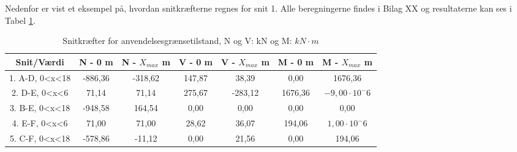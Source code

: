 Nedenfor er vist et eksempel på, hvordan snitkræfterne regnes for snit 1. Alle beregningerne findes i Bilag XX og resultaterne kan ses i Tabel \ref{tab:anden2}.
\begin{table}
	\begin{center}
		\begin{tabular}{|c|c|c|c|c|c|c|}
			\hline
			Snit/Værdi    & N - 0 m & N - $X_{max}$ m & V - 0 m & V - $X_{max}$ m & M - 0 m & M - $X_{max}$ m 	\\ \hline
			1. A-D, 0<x<18 	& -886,36 	& -318,62 	&  147,87 	&  38,39 	&  0,00     &  1676,36        		\\ \hline
			2. D-E, 0<x<6  	&  71,14    &  71,14    &  275,67   & -283,12   &  1676,36  &  $-9,00\cdot10^-6$    \\ \hline
			3. B-E, 0<x<18  & -948,58   &  164,54   &  0,00     &  0,00     &  0,00     &  0,00 			    \\ \hline
			4. E-F, 0<x<6   &  71,00    &  71,00    &  28,62    &  36,07    &  194,06   &  $1,00\cdot10^-6$     \\ \hline
			5. C-F, 0<x<18     & -578,86   & -11,12    &  0,00     &  21,56    &  0,00     &  194,06       		\\ \hline
		\end{tabular}
		\caption{Snitkræfter for anvendelsesgrænsetilstand, N og V: kN og M: $kN\cdot m$}
		\label{tab:anden2}
	\end{center}
\end{table}
